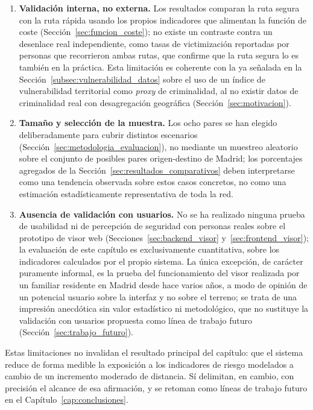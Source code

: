 \begin{enumerate}
    \item \textbf{Validación interna, no externa.} Los resultados comparan la ruta segura con la ruta rápida usando los propios indicadores que alimentan la función de coste (Sección~\ref{sec:funcion_coste}); no existe un contraste contra un desenlace real independiente, como tasas de victimización reportadas por personas que recorrieron ambas rutas, que confirme que la ruta segura lo es también en la práctica. Esta limitación es coherente con la ya señalada en la Sección~\ref{subsec:vulnerabilidad_datos} sobre el uso de un índice de vulnerabilidad territorial como \textit{proxy} de criminalidad, al no existir datos de criminalidad real con desagregación geográfica (Sección~\ref{sec:motivacion}).
    \item \textbf{Tamaño y selección de la muestra.} Los ocho pares se han elegido deliberadamente para cubrir distintos escenarios (Sección~\ref{sec:metodologia_evaluacion}), no mediante un muestreo aleatorio sobre el conjunto de posibles pares origen-destino de Madrid; los porcentajes agregados de la Sección~\ref{sec:resultados_comparativos} deben interpretarse como una tendencia observada sobre estos casos concretos, no como una estimación estadísticamente representativa de toda la red.
    \item \textbf{Ausencia de validación con usuarios.} No se ha realizado ninguna prueba de usabilidad ni de percepción de seguridad con personas reales sobre el prototipo de visor web (Secciones~\ref{sec:backend_visor} y~\ref{sec:frontend_visor}); la evaluación de este capítulo es exclusivamente cuantitativa, sobre los indicadores calculados por el propio sistema. La única excepción, de carácter puramente informal, es la prueba del funcionamiento del visor realizada por un familiar residente en Madrid desde hace varios años, a modo de opinión de un potencial usuario sobre la interfaz y no sobre el terreno; se trata de una impresión anecdótica sin valor estadístico ni metodológico, que no sustituye la validación con usuarios propuesta como línea de trabajo futuro (Sección~\ref{sec:trabajo_futuro}).
\end{enumerate}

Estas limitaciones no invalidan el resultado principal del capítulo: que el sistema reduce de forma medible la exposición a los indicadores de riesgo modelados a cambio de un incremento moderado de distancia. Sí delimitan, en cambio, con precisión el alcance de esa afirmación, y se retoman como líneas de trabajo futuro en el Capítulo~\ref{cap:conclusiones}.

